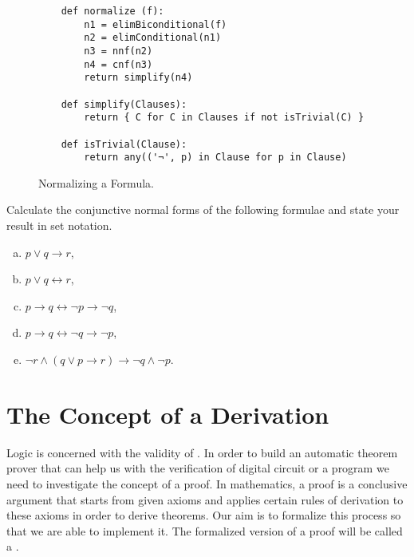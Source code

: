\begin{figure}[!ht]
  \centering
\begin{verbatim}
    def normalize (f):
        n1 = elimBiconditional(f)
        n2 = elimConditional(n1)
        n3 = nnf(n2)
        n4 = cnf(n3)
        return simplify(n4)
    
    def simplify(Clauses):
        return { C for C in Clauses if not isTrivial(C) }
    
    def isTrivial(Clause):
        return any(('¬', p) in Clause for p in Clause)
\end{verbatim} 
\vspace*{-0.3cm}
  \caption{Normalizing a Formula.}
  \label{fig:normalize}
\end{figure}
\pagebreak

\exerciseEng
Calculate the conjunctive normal forms of the following formulae and state your result in set notation.
\begin{enumerate}[(a)]
\item $p \vee q \rightarrow r$,
\item $p \vee q \leftrightarrow r$,
\item $p \rightarrow q \leftrightarrow \neg p \rightarrow \neg q$,
\item $p \rightarrow q \leftrightarrow \neg q \rightarrow \neg p$,
\item $\neg r \wedge (q \vee p \rightarrow r) \rightarrow \neg q \wedge \neg p$.
\end{enumerate}

\section{The Concept of a Derivation}
Logic is concerned with the validity of . In order to build an automatic theorem prover that can 
help us with the verification of digital circuit or a program we need to investigate the concept of a proof.
In mathematics, a proof is a conclusive argument that starts from given axioms and applies certain rules of
derivation to these axioms in order to derive theorems.  Our aim is to formalize this process so that we are
able to implement it. The formalized version of a proof will be called a .

